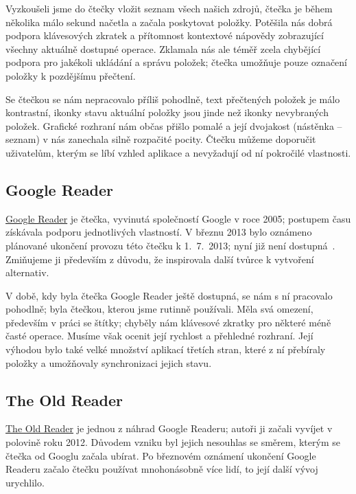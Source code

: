 Vyzkoušeli jsme do čtečky vložit seznam všech našich zdrojů, čtečka je během několika málo sekund načetla a začala poskytovat položky.
Potěšila nás dobrá podpora klávesových zkratek a přítomnost kontextové nápovědy zobrazující všechny aktuálně dostupné operace.
Zklamala nás ale téměř zcela chybějící podpora pro jakékoli ukládání a správu položek; čtečka umožňuje pouze označení položky k pozdějšímu přečtení.

Se čtečkou se nám nepracovalo příliš pohodlně, text přečtených položek je málo kontrastní, ikonky stavu aktuální položky jsou jinde než ikonky nevybraných položek.
Grafické rozhraní nám občas přišlo pomalé a její dvojakost (nástěnka -- seznam) v nás zanechala silně rozpačité pocity.
Čtečku můžeme doporučit uživatelům, kterým se líbí vzhled aplikace a nevyžadují od ní pokročilé vlastnosti.

\subsection{Google Reader}

\href{http://www.google.com/reader/about/}{Google Reader} je čtečka, vyvinutá společností Google v roce 2005; postupem času získávala podporu jednotlivých vlastností.
V březnu 2013 bylo oznámeno plánované ukončení provozu této čtečku k 1.~7.~2013; nyní již není dostupná~\cite{google-reader-down}.
Zmiňujeme ji především z důvodu, že inspirovala další tvůrce k vytvoření alternativ.

V době, kdy byla čtečka Google Reader ještě dostupná, se nám s ní pracovalo pohodlně; byla čtečkou, kterou jsme rutinně používali.
Měla svá omezení, především v práci se štítky; chyběly nám klávesové zkratky pro některé méně časté operace.
Musíme však ocenit její rychlost a přehledné rozhraní.
Její výhodou bylo také velké množství aplikací třetích stran, které z ní přebíraly položky a umožňovaly synchronizaci jejich stavu.

\subsection{The Old Reader}

\href{http://theoldreader.com/}{The Old Reader} je jednou z náhrad Google Readeru; autoři ji začali vyvíjet v polovině roku 2012.
Důvodem vzniku byl jejich nesouhlas se směrem, kterým se čtečka od Googlu začala ubírat.
Po březnovém oznámení ukončení Google Readeru začalo čtečku používat mnohonásobně více lidí, to její další vývoj urychlilo.

